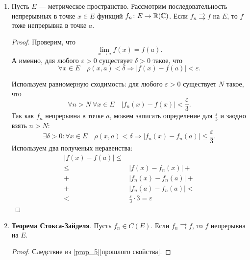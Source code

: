 \begin{prop}
\begin{enumerate}
\begin{proof}
\begin{description}
						Устремим $ m \to  \infty$. Тогда \[
							\lvert f_n(x) - f(x) \rvert \le  \varepsilon
						.\]
						По определению равномерной сходимости получаем, что $ f_n \rightrightarrows f$ на $ E$.
				\end{description}
			\end{proof}
		\item \label{prop_5} Пусть $ E$ --- метрическое пространство. Рассмотрим последовательность непрерывных в точке $ x \in E$ функций $ f_n \colon E \to \mathbb{R}(\mathbb{C}) $. Если $ f_n \rightrightarrows f$ на $ E$, то  $ f$ тоже непрерывна в точке  $ a$.
			\begin{proof}
				Проверим, что
				\[
					\lim_{x \to  a} f(x) = f(a)
				.\]
				А именно, для любого $ \varepsilon  > 0$ существует $ \delta > 0$ такое, что
				\[
					\forall x \in E \quad \rho(x, a) < \delta \Longrightarrow \lvert f(x) - f(a) \rvert  < \varepsilon
				.\]

				Используем равномерную сходимость: для любого  $ \varepsilon > 0$ существует $ N$ такое, что
				\[\label{eq:koshi_1}
					\forall n > N ~ \forall x \in E \quad \lvert f_n(x) - f(x) \rvert  < \frac{\varepsilon}{3}
				.\]
				Так как $ f_n$ непрерывна в точке $ a$, можем записать определение для  $ \frac{\varepsilon}{3}$ и заодно взять $ n > N$:
				\[
					\exists \delta >0 \colon \forall x \in  E \quad \rho(x, a) < \delta \Longrightarrow \lvert f_n(x) - f_n(a) \rvert \le \frac{\varepsilon}{3}
				.\]
				Используем два полученых неравенства:
				\begin{align*}
					\lvert f(x) - f(a) \rvert \le  & \\
					\le  & \lvert f(x) - f_n(x) \rvert + \\
					+ & \lvert f_n(x) - f_n(a) \rvert + \\
					+ & \lvert f_n(a) - f_n(a) \rvert < \\
					< & \frac{\varepsilon}{3} \cdot  3 = \varepsilon
				\end{align*}
			\end{proof}

		\item {\bf Теорема Стокса-Зайделя}. Пусть $ f_n \in C(E)$. Если $ f_n \rightrightarrows f$, то $ f$ непрерывна на $ E$.
			\begin{proof}
				Следствие из \ref{prop_5}[прошлого свойства].
			\end{proof}
	\end{enumerate}
\end{prop}

